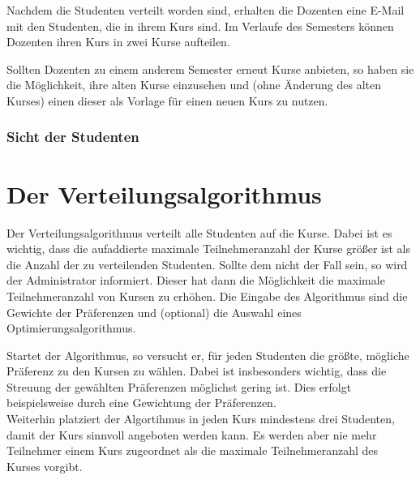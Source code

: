             
        Nachdem die Studenten verteilt worden sind, erhalten die Dozenten eine E-Mail mit den Studenten, die in ihrem Kurs sind.
        Im Verlaufe des Semesters können Dozenten ihren Kurs in zwei Kurse aufteilen.

        
        
        Sollten Dozenten zu einem anderem Semester erneut Kurse anbieten, so haben sie die Möglichkeit, ihre alten Kurse einzusehen und (ohne Änderung des alten Kurses) einen dieser als Vorlage für einen neuen Kurs zu nutzen.

            
        \subsubsection{Sicht der Studenten}




        

\section{Der Verteilungsalgorithmus}
Der Verteilungsalgorithmus verteilt alle Studenten auf die Kurse.
Dabei ist es wichtig, dass die aufaddierte maximale Teilnehmeranzahl der Kurse größer ist als die Anzahl der zu verteilenden Studenten.
Sollte dem nicht der Fall sein, so wird der Administrator informiert.
Dieser hat dann die Möglichkeit die maximale Teilnehmeranzahl von Kursen zu erhöhen.
Die Eingabe des Algorithmus sind die Gewichte der Präferenzen und (optional) die Auswahl eines Optimierungsalgorithmus.

Startet der Algorithmus, so versucht er, für jeden Studenten die größte, mögliche Präferenz zu den Kursen zu wählen.
Dabei ist insbesonders wichtig, dass die Streuung der gewählten Präferenzen möglichst gering ist.
Dies erfolgt beispielsweise durch eine Gewichtung der Präferenzen.\\
Weiterhin platziert der Algortihmus in jeden Kurs mindestens drei Studenten, damit der Kurs sinnvoll angeboten werden kann.
Es werden aber nie mehr Teilnehmer einem Kurs zugeordnet als die maximale Teilnehmeranzahl des Kurses vorgibt.

